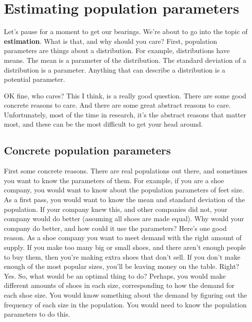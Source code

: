 \documentclass[]{book}
\begin{document}
\hypertarget{estimating-population-parameters}{%
\section{Estimating population parameters}\label{estimating-population-parameters}}

Let's pause for a moment to get our bearings. We're about to go into the topic of \textbf{estimation}. What is that, and why should you care? First, population parameters are things about a distribution. For example, distributions have means. The mean is a parameter of the distribution. The standard deviation of a distribution is a parameter. Anything that can describe a distribution is a potential parameter.

OK fine, who cares? This I think, is a really good question. There are some good concrete reasons to care. And there are some great abstract reasons to care. Unfortunately, most of the time in research, it's the abstract reasons that matter most, and these can be the most difficult to get your head around.

\hypertarget{concrete-population-parameters}{%
\subsection{Concrete population parameters}\label{concrete-population-parameters}}

First some concrete reasons. There are real populations out there, and sometimes you want to know the parameters of them. For example, if you are a shoe company, you would want to know about the population parameters of feet size. As a first pass, you would want to know the mean and standard deviation of the population. If your company knew this, and other companies did not, your company would do better (assuming all shoes are made equal). Why would your company do better, and how could it use the parameters? Here's one good reason. As a shoe company you want to meet demand with the right amount of supply. If you make too many big or small shoes, and there aren't enough people to buy them, then you're making extra shoes that don't sell. If you don't make enough of the most popular sizes, you'll be leaving money on the table. Right? Yes. So, what would be an optimal thing to do? Perhaps, you would make different amounts of shoes in each size, corresponding to how the demand for each shoe size. You would know something about the demand by figuring out the frequency of each size in the population. You would need to know the population parameters to do this.
\end{document}
